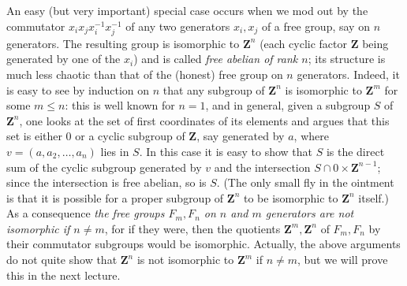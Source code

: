 \documentclass[10pt]{article}
\begin{document}
 An easy (but very important) special case occurs when we mod out by the
 commutator $x_i x_j x_i^{-1} x_j^{-1}$ of any two generators $x_i,x_j$
 of a free group, say on $n$ generators. The resulting group is
 isomorphic to $\mathbf{Z}^n$ (each cyclic factor $\mathbf{Z}$ being
 generated by one of the $x_i$) and is called {\sl free abelian of rank
   $n$}; its structure is much less chaotic than that of the (honest)
 free group on $n$ generators. Indeed, it is easy to see by induction on
 $n$ that any subgroup of $\mathbf{Z}^n$ is isomorphic to $\mathbf{Z}^m$
 for some $m\le n$: this is well known for $n=1$, and in general, given
 a subgroup $S$ of $\mathbf{Z}^n$, one looks at the set of first
 coordinates of its elements and argues that this set is either 0 or a
 cyclic subgroup of $\mathbf{Z}$, say generated by $a$, where
 $v=(a,a_2,\ldots,a_n)$ lies in $S$. In this case it is easy to show
 that $S$ is the direct sum of the cyclic subgroup generated by $v$ and
 the intersection $S\cap 0\times \mathbf{Z}^{n-1}$; since the
 intersection is free abelian, so is $S$. (The only small fly in the
 ointment is that it is possible for a proper subgroup of $\mathbf{Z}^n$
 to be isomorphic to $\mathbf{Z}^n$ itself.) As a consequence {\sl the
   free groups $F_m,F_n$ on $n$ and $m$ generators are not isomorphic if
   $n\ne m$}, for if they were, then the quotients
 $\mathbf{Z}^m,\mathbf{Z}^n$ of $F_m,F_n$ by their commutator subgroups
 would be isomorphic. Actually, the above arguments do not quite show
 that $\mathbf{Z}^n$ is not isomorphic to $\mathbf{Z}^m$ if $n\ne m$,
 but we will prove this in the next lecture.
\end{document}

